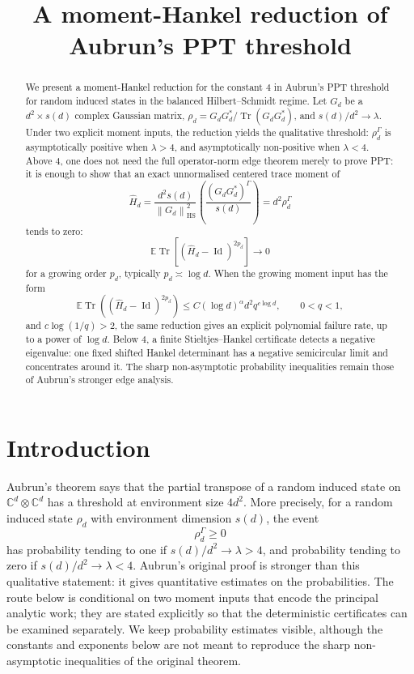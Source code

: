 \documentclass[11pt,reqno]{amsart}
\title[A moment-Hankel reduction of the PPT threshold]{A moment-Hankel reduction of Aubrun's PPT threshold}
\author{}
\date{}
\newcommand{\C}{\mathbb C}
\newcommand{\EE}{\mathbb E}
\newcommand{\Tr}{\operatorname{Tr}}
\newcommand{\Id}{\operatorname{Id}}
\newcommand{\HS}{\mathrm{HS}}
\newcommand{\norm}[1]{\left\lVert #1\right\rVert}
\begin{document}
\maketitle

\begin{abstract}
We present a moment-Hankel reduction for the constant \(4\) in Aubrun's
PPT threshold for random induced states in the balanced Hilbert--Schmidt
regime.  Let \(G_d\) be a \(d^2\times s(d)\) complex Gaussian matrix,
\(\rho_d=G_dG_d^*/\Tr(G_dG_d^*)\), and \(s(d)/d^2\to\lambda\).  Under two
explicit moment inputs, the reduction yields the qualitative threshold:
\(\rho_d^\Gamma\) is asymptotically positive when \(\lambda>4\), and
asymptotically non-positive when \(\lambda<4\).  Above \(4\), one does not
need the full operator-norm edge theorem merely to prove PPT: it is enough to
show that an exact unnormalised centered trace moment of
\[
  \widehat H_d
  =
  \frac{d^2s(d)}{\norm{G_d}_{\HS}^2}
  \left(\frac{(G_dG_d^*)^\Gamma}{s(d)}\right)
  =
  d^2\rho_d^\Gamma
\]
tends to zero:
\[
  \EE\Tr\left[(\widehat H_d-\Id)^{2p_d}\right]\longrightarrow0
\]
for a growing order \(p_d\), typically \(p_d\asymp\log d\).
When the growing moment input has the form
\[
  \EE\Tr((\widehat H_d-\Id)^{2p_d})
  \le C(\log d)^\alpha d^2 q^{c\log d},
  \qquad 0<q<1,
\]
and \(c\log(1/q)>2\), the same reduction gives an explicit polynomial
failure rate, up to a power of \(\log d\).
Below \(4\), a finite Stieltjes--Hankel certificate detects a negative
eigenvalue: one fixed shifted Hankel determinant has a negative semicircular
limit and concentrates around it.  The sharp non-asymptotic probability
inequalities remain those of Aubrun's stronger edge analysis.
\end{abstract}

\section{Introduction}

Aubrun's theorem says that the partial transpose of a random induced state on
\(\C^d\otimes\C^d\) has a threshold at environment size \(4d^2\).  More
precisely, for a random induced state \(\rho_d\) with environment dimension
\(s(d)\), the event
\[
  \rho_d^\Gamma\ge0
\]
has probability tending to one if \(s(d)/d^2\to\lambda>4\), and probability
tending to zero if \(s(d)/d^2\to\lambda<4\).  Aubrun's original proof is
stronger than this qualitative statement: it gives quantitative estimates on
the probabilities.  The route below is conditional on two moment inputs that
encode the principal analytic work; they are stated explicitly so that the
deterministic certificates can be examined separately.  We keep probability
estimates visible, although the constants and exponents below are not meant
to reproduce the sharp non-asymptotic inequalities of the original theorem.
\end{document}
